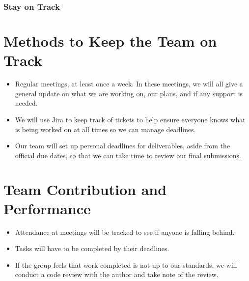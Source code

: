 \documentclass{article}
\begin{document}
\subsubsection*{Stay on Track}



\section*{Methods to Keep the Team on Track}
\begin{itemize}
    \item Regular meetings, at least once a week. In these meetings, we will all give a general update on what we are working on, our plans, and if any support is needed.
    \item We will use Jira to keep track of tickets to help ensure everyone knows what is being worked on at all times so we can manage deadlines.
    \item Our team will set up personal deadlines for deliverables, aside from the official due dates, so that we can take time to review our final submissions.
\end{itemize}

\section*{Team Contribution and Performance}

\begin{itemize}
    \item Attendance at meetings will be tracked to see if anyone is falling behind.
    \item Tasks will have to be completed by their deadlines.
    \item If the group feels that work completed is not up to our standards, we will conduct a code review with the author and take note of the review.
\end{itemize}
\end{document}
